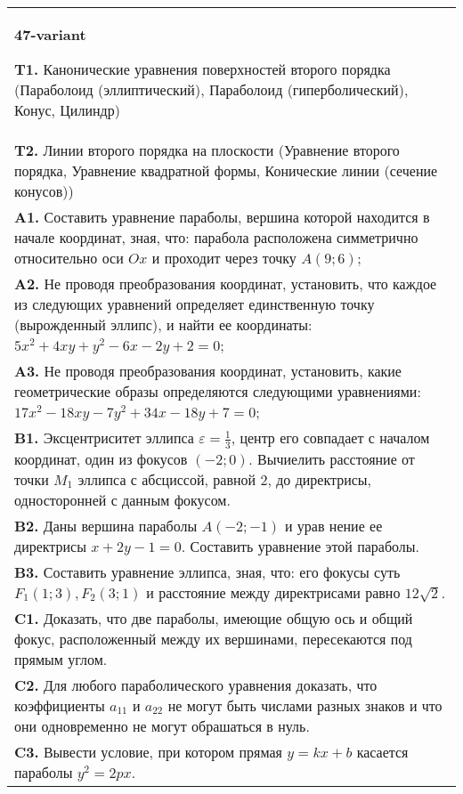 \documentclass{article}
\begin{document}
\begin{tabular}{m{17cm}}
\textbf{47-variant}
\newline

\textbf{T1.} Канонические уравнения поверхностей второго порядка (Параболоид (эллиптический), Параболоид (гиперболический), Конус, Цилиндр) \\
\textbf{T2.} Линии второго порядка на плоскости (Уравнение второго порядка, Уравнение квадратной формы, Конические линии (сечение конусов)) \\
\textbf{A1.} Составить уравнение параболы, вершина которой находится в начале координат, зная, что: парабола расположена симметрично относительно оси $O x$ и проходит через точку $A(9 ; 6)$; \\
\textbf{A2.} Не проводя преобразования координат, установить, что каждое из следующих уравнений определяет единственную точку (вырожденный эллипс), и найти ее координаты: $5 x^2+4 x y+y^2-6 x-2 y+2=0$; \\
\textbf{A3.} Не проводя преобразования координат, установить, какие геометрические образы определяются следующими уравнениями: $17 x^2-18 x y-7 y^2+34 x-18 y+7=0$; \\
\textbf{B1.} Эксцентриситет эллипса $\varepsilon=\frac{1}{3}$, центр его совпадает с началом координат, один из фокусов $(-2 ; 0)$. Вычиелить расстояние от точки $M_1$ эллипса с абсциссой, равной 2, до директрисы, односторонней с данным фокусом. \\
\textbf{B2.} Даны вершина параболы $A(-2 ;-1)$ и урав нение ее директрисы $x+2 y-1=0$. Составить уравнение этой параболы. \\
\textbf{B3.} Составить уравнение эллипса, зная, что: его фокусы суть $F_1(1 ; 3), F_2(3 ; 1)$ и расстояние между директрисами равно $12 \sqrt{2}$. \\
\textbf{C1.} Доказать, что две параболы, имеющие общую ось и общий фокус, расположенный между их вершинами, пересекаются под прямым углом. \\
\textbf{C2.} Для любого параболического уравнения доказать, что коэффициенты $a_{11}$ и $a_{22}$ не могут быть числами разных знаков и что они одновременно не могут обрашаться в нуль. \\
\textbf{C3.} Вывести условие, при котором прямая $y=k x+b$ касается параболы $y^2=2 p x$. \\

\end{tabular}
\vspace{1cm}
\end{document}
